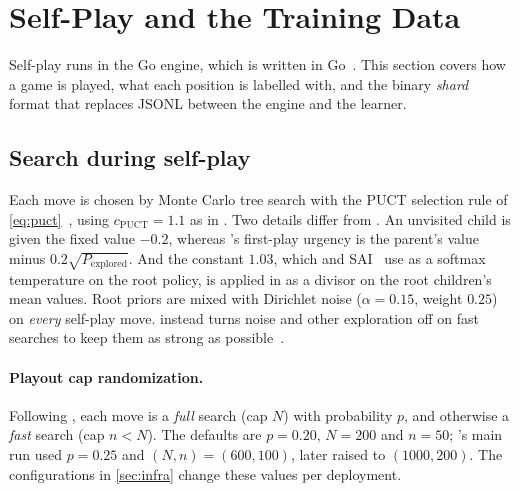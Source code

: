 \section{Self-Play and the Training Data}
\label{sec:selfplay}

Self-play runs in the Go engine, which is written in Go~\citep{donovan2015go}. This
section covers how a game is played, what each position is labelled with, and the binary
\emph{shard} format that replaces JSONL between the engine and the learner.

\subsection{Search during self-play}
\label{sec:selfplay-search}

Each move is chosen by Monte Carlo tree search with the PUCT selection rule of
\cref{eq:puct}~\citep{rosin2011multi,silver2017mastering}, using $c_{\mathrm{PUCT}}=1.1$
as in \citet{wu2019accelerating}. Two details differ from \katago{}. An unvisited child is
given the fixed value $-0.2$, whereas \katago{}'s first-play urgency is the parent's value
minus $0.2\sqrt{P_{\mathrm{explored}}}$. And the constant $1.03$, which \katago{} and
SAI~\citep{morandin2019sai} use as a softmax temperature on the root policy, is applied
in \gofer{} as a divisor on the root children's mean values. Root priors are mixed with Dirichlet noise ($\alpha=0.15$, weight $0.25$) on \emph{every}
self-play move. \katago{} instead turns noise and other exploration off on fast searches
to keep them as strong as possible~\citep[\S3.1]{wu2019accelerating}.

\paragraph{Playout cap randomization.}
Following \citet[\S3.1]{wu2019accelerating}, each move is a \emph{full} search (cap $N$)
with probability $p$, and otherwise a \emph{fast} search (cap $n<N$). The \gofer{}
defaults are $p=0.20$, $N=200$ and $n=50$; \katago{}'s main run used $p=0.25$ and
$(N,n)=(600,100)$, later raised to $(1000,200)$. The configurations in
\cref{sec:infra} change these values per deployment.

